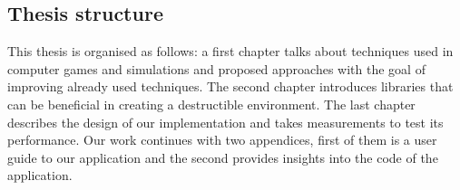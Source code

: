 \subsection*{Thesis structure}
This thesis is organised as follows: a first chapter talks about techniques used in computer games and simulations and proposed approaches with the goal of improving already used techniques. The second chapter introduces libraries that can be beneficial in creating a destructible environment. The last chapter describes the design of our implementation and takes measurements to test its performance. Our work continues with two appendices, first of them is a user guide to our application and the second provides insights into the code of the application. 

